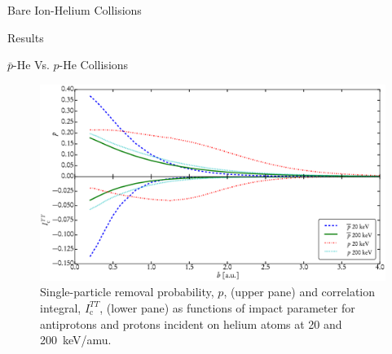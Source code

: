 \documentclass[letterpaper, 11 pt]{report}
\begin{document}
\begin{chapter}{Bare Ion-Helium Collisions \label{chap:p-he2p-he}}
\begin{section}{Results \label{sec:phe2p-res}}
\begin{subsection}{ \texorpdfstring{$\bar{p}$}{pbar}-He Vs. \texorpdfstring{$p$}{p}-He Collisions
                         \label{sec:pbarhe-res}}
         \begin{figure}[t]
            \centering
            \includegraphics[width = 0.95 \linewidth]{./images/p-ic.eps}
            \caption[Single-particle removal and correlation integral]
                    {Single-particle removal probability, $p$, (upper pane) and
                     correlation integral, $I_\mathrm{c}^{TT}$, (lower pane) as functions of impact
                     parameter for antiprotons and protons incident on helium atoms at 20 and
                     200~keV/amu. \label{fig:p-ic}}
         \end{figure}


\end{subsection}
\end{section}
\end{chapter}
\end{document}

